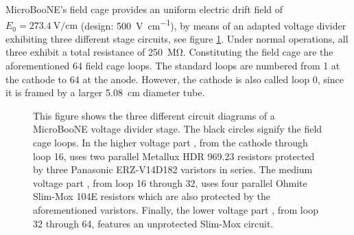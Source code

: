 MicroBooNE's field cage provides an uniform electric drift field of $E_0 = \SI{273.4}{\volt\per\centi\metre}$ (design: \SI{500}{\volt\per\centi\metre}), by means of an adapted voltage divider exhibiting three different stage circuits, see figure \ref{fig:VoltageDividerCircuits}. Under normal operations, all three exhibit a total resistance of \SI{250}{\mega\ohm}. Constituting the field cage are the aforementioned \num{64} field cage loops. The standard loops are numbered from \num{1} at the cathode to \num{64} at the anode. However, the cathode is also called loop \num{0}, since it is framed by a larger \SI{5.08}{\centi\metre} diameter tube.
\begin{figure}[htbp]
    \centering
    \caption[MicroBooNE's Voltage Divider Circuits]{This figure shows the three different circuit diagrams of a MicroBooNE voltage divider stage. The black circles signify the field cage loops. In the higher voltage part , from the cathode through loop \num{16}, uses two parallel Metallux HDR 969.23 resistors protected by three Panasonic ERZ-V14D182 varistors in series. The medium voltage part , from loop \num{16} through \num{32}, uses four parallel Ohmite Slim-Mox 104E resistors which are also protected by the aforementioned varistors. Finally, the lower voltage part , from loop \num{32} through \num{64}, features an unprotected Slim-Mox circuit.}
    \label{fig:VoltageDividerCircuits}
\end{figure}
